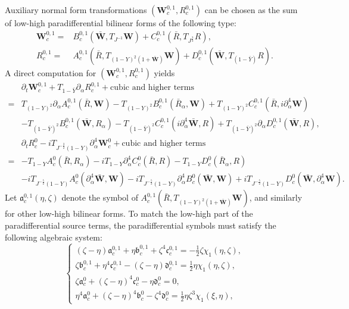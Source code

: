 \documentclass[10pt]{amsart}
\theoremstyle{remark}
\theoremstyle{definition}
\numberwithin{equation}{section}
\newcommand{\p}{\partial}
\newcommand{\al}{\alpha}
\newcommand{\f}{\frac}
\newcommand{\bw}{\mathbf{W}}
\begin{document}
 Auxiliary normal form transformations $(\bw^{0,1}_c, R^{0,1}_c)$ can be chosen as the sum of low-high paradifferential bilinear forms of the following type:
\begin{align*}
\bw^{0,1}_{c} =& B^{0,1}_{c}\left(\bar{\bw}, T_{J^{-1}}\bw \right) + C^{0,1}_{c}\left(\bar{R}, T_{J^{\f32}} R\right),\\
R^{0,1}_{c} =& A^{0,1}_{c} \left(\bar{R}, T_{(1-Y)^2(1+\bar{\bw})}\bw \right) + D^{0,1}_{c}\left(\bar{\bw}, T_{(1-\bar{Y})}R\right).    
\end{align*} 
A direct computation for $(\bw^{0,1}_c, R^{0,1}_c)$ yields
\begin{align*}
 &\p_t \bw^{0,1}_c+T_{1-\bar{Y}}\p_\al R^{0,1}_c  + \text{cubic and higher terms} \\
=& T_{(1-Y)^2}\partial_\alpha A^{0,1}_c(\bar{R}, \bw) -T_{(1-Y)^2}B^{0,1}_{c}(\bar{R}_\alpha, \bw) +  T_{(1-Y)^2}C^{0,1}_{c}(\bar{R}, i\p_\al^4\bw) \\
 &-T_{(1-\bar{Y})^2}B^{0,1}_{c}(\bar{\bw}, R_\alpha)-T_{(1-\bar{Y})^2}C^{0,1}_{c}(i\p_\al^4\bar{\bw}, R) + T_{(1-\bar{Y})^2}\partial_\alpha D^{0,1}_{c}(\bar{\bw}, R),\\
&\p_t R^0_c-iT_{J^{-\f32}(1-Y)}\p_\al^4\bw^0_c+ \text{cubic and higher  terms} \\
=& -T_{1-Y}A^0_{c}(\bar{R}, R_\alpha) - iT_{1-Y}\partial_\alpha^4 C^0_{c}(\bar{R}, R) - T_{1-Y}D^0_{c}(\bar{R}_\alpha, R)\\
&- iT_{J^{-\f52}(1-Y)}A^0_{c}(\p_\al^4\bar{\bw}, \bw) -iT_{J^{-\f52}(1-Y)}\partial_\alpha^4 B^0_{c}(\bar{\bw}, \bw) +iT_{J^{-\f52}(1-Y)}D^0_{c}(\bar{\bw}, \p_\al^4\bw).
\end{align*}
Let $\mathfrak{a}^{0,1}_{c}(\eta, \zeta)$ denote the symbol of $A^{0,1}_{c}(\bar{R}, T_{(1-Y)^2(1+\bar{\bw})}\bw)$, and similarly for other low-high bilinear forms. To match the low-high part of the paradifferential source terms, the paradifferential symbols must satisfy the following algebraic system:
\begin{equation*}
\begin{cases}
(\zeta - \eta)\mathfrak{a}^{0,1}_{c}+\eta\mathfrak{b}^{0,1}_{c}+\zeta^4\mathfrak{c}^{0,1}_{c}= -\f12 \zeta\chi_1(\eta, \zeta),\\
\zeta\mathfrak{b}^{0,1}_{c}+\eta^4\mathfrak{c}^{0,1}_{c}-(\zeta-\eta)\mathfrak{d}^{0,1}_{c}=\f12 \eta\chi_{1}(\eta,\zeta),\\
\zeta\mathfrak{a}^0_{c}+(\zeta-\eta)^4\mathfrak{c}^0_{c}-\eta\mathfrak{d}^0_{c}=0,\\
\eta^4 \mathfrak{a}^0_{c}+(\zeta-\eta)^4\mathfrak{b}^0_{c}-\zeta^4\mathfrak{d}^0_{c}=\f12\eta\zeta^3\chi_{1}(\xi,\eta),
\end{cases}
\end{equation*}
\end{document}
